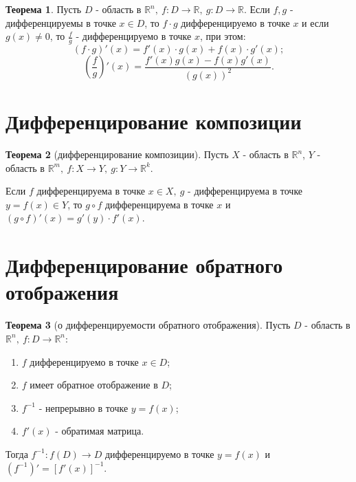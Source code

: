 \documentclass{report}
\theoremstyle{definition}
\newtheorem*{theorem}{Теорема}
\begin{document}
\begin{theorem}
    Пусть $D$ - область в $\mathbb{R}^n, \ f:D\rightarrow\mathbb{R}, \ g:D\rightarrow\mathbb{R}$. Если $f,g$ - дифференцируемы в точке $x \in D$,
    то $f\cdot g$ дифференцируемо в точке $x$ и если $g(x) \ne 0$, то $\frac{f}{g}$ - дифференцируемо в точке $x$, при
    этом:
    \begin{equation*}
      (f\cdot g)'(x) = f'(x)\cdot g(x) + f(x)\cdot g'(x);
    \end{equation*}
    \begin{equation*}
      (\frac{f}{g})'(x) = \frac{f'(x)g(x) - f(x)g'(x)}{(g(x))^2}.
    \end{equation*}
  \end{theorem}

\section{Дифференцирование композиции}

\begin{theorem}[дифференцирование композиции]
    Пусть $X$ - область в $\mathbb{R}^n$, $Y$ - область в $\mathbb{R}^m, \ f:X\rightarrow Y, \ g:Y\rightarrow\mathbb{R}^k$.

    Если $f$ дифференцируема в точке $x \in X, \ g$ - дифференцируема в точке $y = f(x) \in Y$, то $g \circ f$ дифференцируема в точке $x$ и $(g \circ f)'(x) = g'(y) \cdot f'(x)$.
\end{theorem}

\section{Дифференцирование обратного отображения}

\begin{theorem}[о дифференцируемости обратного отображения]
    Пусть $D$ - область в $\mathbb{R}^n, \ f: D \rightarrow \mathbb{R}^n:$
    \begin{enumerate}
        \item $f$ дифференцируемо в точке $x \in D$;
        \item $f$ имеет обратное отображение в $D$;
        \item $f^{-1}$ - непрерывно в точке $y = f(x)$;
        \item $f'(x)$ - обратимая матрица.
    \end{enumerate}

    Тогда $f^{-1}:f(D)\rightarrow D$ дифференцируемо в точке $y = f(x)$ и $(f^{-1})' = [f'(x)]^{-1}$.
\end{theorem}
\end{document}
